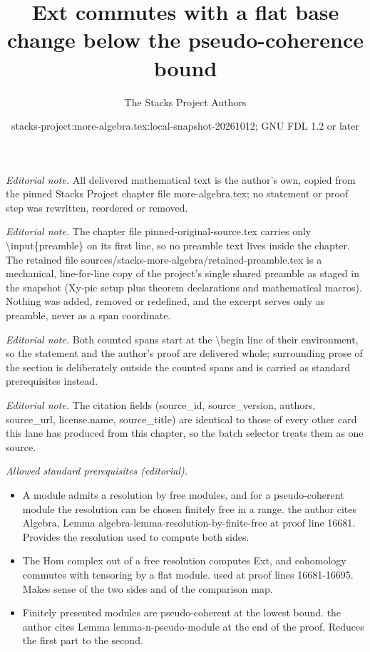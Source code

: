 \documentclass[10pt,a4paper]{amsart}
\title{Ext commutes with a flat base change below the pseudo-coherence bound}
\author{The Stacks Project Authors}
\date{stacks-project:more-algebra.tex:local-snapshot-20261012; GNU FDL 1.2 or later}
\theoremstyle{plain}
\theoremstyle{definition}
\theoremstyle{remark}
\numberwithin{equation}{subsection}
\begin{document}
\maketitle
\setcounter{subsection}{1}
\noindent\textit{Editorial note.} All delivered mathematical text is the author's own, copied from the pinned Stacks Project chapter file more-algebra.tex; no statement or proof step was rewritten, reordered or removed.\par\medskip
\noindent\textit{Editorial note.} The chapter file pinned-original-source.tex carries only \textbackslash{}input\{preamble\} on its first line, so no preamble text lives inside the chapter. The retained file sources/stacks-more-algebra/retained-preamble.tex is a mechanical, line-for-line copy of the project's single shared preamble as staged in the snapshot (Xy-pic setup plus theorem declarations and mathematical macros). Nothing was added, removed or redefined, and the excerpt serves only as preamble, never as a span coordinate.\par\medskip
\noindent\textit{Editorial note.} Both counted spans start at the \textbackslash{}begin line of their environment, so the statement and the author's proof are delivered whole; surrounding prose of the section is deliberately outside the counted spans and is carried as standard prerequisites instead.\par\medskip
\noindent\textit{Editorial note.} The citation fields (source\_id, source\_version, authors, source\_url, license.name, source\_title) are identical to those of every other card this lane has produced from this chapter, so the batch selector treats them as one source.\par\medskip
\noindent\textit{Allowed standard prerequisites (editorial).}\begin{itemize}
\item A module admits a resolution by free modules, and for a pseudo-coherent module the resolution can be chosen finitely free in a range. the author cites Algebra, Lemma algebra-lemma-resolution-by-finite-free at proof line 16681. Provides the resolution used to compute both sides.
\item The Hom complex out of a free resolution computes Ext, and cohomology commutes with tensoring by a flat module. used at proof lines 16681-16695. Makes sense of the two sides and of the comparison map.
\item Finitely presented modules are pseudo-coherent at the lowest bound. the author cites Lemma lemma-n-pseudo-module at the end of the proof. Reduces the first part to the second.
\end{itemize}\medskip
\end{document}
